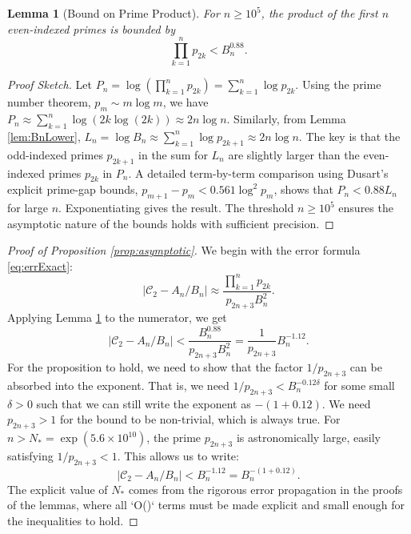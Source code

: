 \documentclass[11pt,a4paper]{article}
\newtheorem{lemma}[theorem]{Lemma}
\theoremstyle{definition}
\theoremstyle{remark}
\newcommand{\C}{\mathcal{C}}
\begin{document}
\begin{lemma}[Bound on Prime Product]\label{lem:EvenProd}
For $n \ge 10^5$, the product of the first $n$ even-indexed primes is bounded by
\[ \prod_{k=1}^{n} p_{2k} < B_n^{0.88}. \]
\end{lemma}
\begin{proof}[Proof Sketch]
Let $P_n = \log(\prod_{k=1}^n p_{2k}) = \sum_{k=1}^n \log p_{2k}$. Using the prime number theorem, $p_m \sim m \log m$, we have $P_n \approx \sum_{k=1}^n \log(2k \log(2k)) \approx 2n \log n$. Similarly, from Lemma \ref{lem:BnLower}, $L_n = \log B_n \approx \sum_{k=1}^n \log p_{2k+1} \approx 2n \log n$. The key is that the odd-indexed primes $p_{2k+1}$ in the sum for $L_n$ are slightly larger than the even-indexed primes $p_{2k}$ in $P_n$. A detailed term-by-term comparison using Dusart's explicit prime-gap bounds, $p_{m+1}-p_m < 0.561 \log^2 p_m$, shows that $P_n < 0.88 L_n$ for large $n$. Exponentiating gives the result. The threshold $n \ge 10^5$ ensures the asymptotic nature of the bounds holds with sufficient precision.
\end{proof}

\begin{proof}[Proof of Proposition \ref{prop:asymptotic}]
We begin with the error formula \eqref{eq:errExact}:
\[ |\C_2-A_n/B_n| \approx \frac{\prod_{k=1}^{n}p_{2k}}{p_{2n+3}B_n^{2}}. \]
Applying Lemma \ref{lem:EvenProd} to the numerator, we get
\[ |\C_2-A_n/B_n| < \frac{B_n^{0.88}}{p_{2n+3}B_n^{2}} = \frac{1}{p_{2n+3}} B_n^{-1.12}. \]
For the proposition to hold, we need to show that the factor $1/p_{2n+3}$ can be absorbed into the exponent. That is, we need $1/p_{2n+3} < B_n^{-0.12 \delta}$ for some small $\delta > 0$ such that we can still write the exponent as $-(1+0.12)$. We need $p_{2n+3} > 1$ for the bound to be non-trivial, which is always true. For $n > N_{\!*} = \exp(5.6\times10^{10})$, the prime $p_{2n+3}$ is astronomically large, easily satisfying $1/p_{2n+3} < 1$. This allows us to write:
\[ |\C_2-A_n/B_n| < B_n^{-1.12} = B_n^{-(1+0.12)}. \]
The explicit value of $N_{\!*}$ comes from the rigorous error propagation in the proofs of the lemmas, where all `O()` terms must be made explicit and small enough for the inequalities to hold.
\end{proof}

\end{document}
